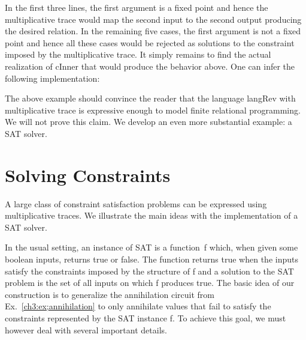 \documentclass{llncs}
\begin{document}

In the first three lines, the first argument is a fixed point and hence the
multiplicative trace would map the second input to the second output
producing the desired relation. In the remaining five cases, the first
argument is not a fixed point and hence all these cases would be rejected as
solutions to the constraint imposed by the multiplicative trace. It simply
remains to find the actual realization of {{cInner}} that would produce the
behavior above. One can infer the following implementation:

%     

The above example should convince the reader that the language {{langRev}}
with multiplicative trace is expressive enough to model finite relational
programming. We will not prove this claim. We develop an even more
substantial example: a SAT solver.

\section{Solving Constraints}
\label{ch3:sec:constraints}

A large class of constraint satisfaction problems can be expressed
using multiplicative traces. We illustrate the main ideas with the
implementation of a SAT solver.

In the usual setting, an instance of SAT is a function~{{f}} which,
when given some boolean inputs, returns {{true}} or {{false}}. The
function returns {{true}} when the inputs satisfy the constraints
imposed by the structure of {{f}} and a solution to the SAT problem is
the set of all inputs on which {{f}} produces {{true}}. The basic idea
of our construction is to generalize the annihilation circuit from
Ex.~\ref{ch3:ex;annihilation} to only annihilate values that fail to
satisfy the constraints represented by the SAT instance {{f}}. To
achieve this goal, we must however deal with several important
details.
\end{document}
